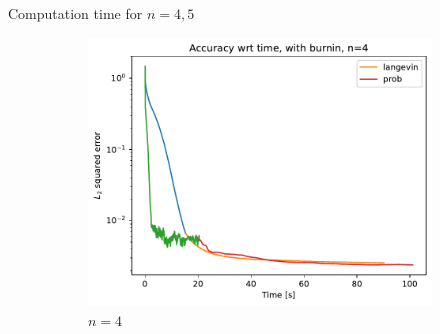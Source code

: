 \documentclass{beamer}
\begin{document}
\begin{frame}{Computation time for $n=4,5$}
    
    \begin{figure}[H]

        \centering
    
        \begin{subfigure}[b]{0.49\textwidth}
    
    
            \centering
    
            \includegraphics[width=\textwidth]{figures/experiments/baseline/diff_n_qubits/iters_acc_comp_time_no_avg_n4-1.png}
    
            \caption{$n=4$}
    
            \label{fig:conv-plot-diff-n-4-sub}
    
        \end{subfigure}
        \hfill
        \begin{subfigure}[b]{0.49\textwidth}
    
    

\end{subfigure}
\end{figure}
\end{frame}
\end{document}
